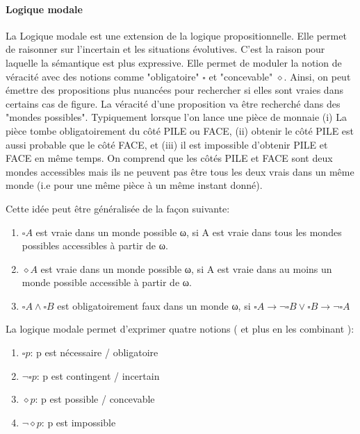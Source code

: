 \begin{refsegment}
    \paragraph{Logique modale}
    La Logique modale est une extension de la logique propositionnelle. Elle permet de raisonner sur l'incertain et les situations évolutives. C'est la raison pour laquelle la sémantique est plus expressive. Elle permet de moduler la notion de véracité avec des notions comme "obligatoire" $\square$ et "concevable" $\diamond$. Ainsi, on peut émettre des propositions plus nuancées pour rechercher si elles sont vraies dans certains cas de figure. La véracité d'une proposition va être recherché dans des "mondes possibles". Typiquement lorsque l'on lance une pièce de monnaie (i) La pièce tombe obligatoirement du côté PILE ou FACE, (ii) obtenir le côté PILE est aussi probable que le côté FACE, et (iii) il est impossible d'obtenir PILE et FACE en même temps. On comprend que les côtés PILE et FACE sont deux mondes accessibles mais ils ne peuvent pas être tous les deux vrais dans un même monde (i.e pour une même pièce à un même instant donné).
    
    Cette idée peut être généralisée de la façon suivante:\nolisttopbreak
    \begin{enumerate}[label=\roman*)]
        \item $\square A$ est vraie dans un monde possible ω, si A est vraie dans tous les mondes possibles accessibles à partir de ω.
        \item $\diamond A$ est vraie dans un monde possible ω, si A est vraie dans au moins un monde possible accessible à partir de ω.
        \item $\square A \land \square B$ est obligatoirement faux dans un monde ω, si $\square A \to \lnot \square B \lor \square B \to \lnot\square A$
    \end{enumerate}

    La logique modale permet d'exprimer quatre notions ( et plus en les combinant ):\nolisttopbreak
    \begin{enumerate}[label={}]
        \item $\square p$: p est nécessaire / obligatoire
        \item $\lnot\square p$: p est contingent / incertain
        \item $\diamond p$: p est possible / concevable
        \item $\lnot \diamond p$: p est impossible
    \end{enumerate}


\end{refsegment}
